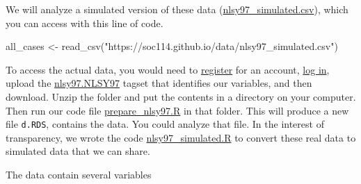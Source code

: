 \documentclass[
  letterpaper,
  DIV=11,
  numbers=noendperiod]{scrartcl}
\newenvironment{Shaded}{\begin{snugshade}}{\end{snugshade}}
\newcommand{\FunctionTok}[1]{\textcolor[rgb]{0.28,0.35,0.67}{#1}}
\newcommand{\NormalTok}[1]{\textcolor[rgb]{0.00,0.23,0.31}{#1}}
\newcommand{\OtherTok}[1]{\textcolor[rgb]{0.00,0.23,0.31}{#1}}
\newcommand{\StringTok}[1]{\textcolor[rgb]{0.13,0.47,0.30}{#1}}
\begin{document}
We will analyze a simulated version of these data
(\href{../data/nlsy97_simulated.csv}{nlsy97\_simulated.csv}), which you
can access with this line of code.

\begin{Shaded}
\begin{Highlighting}[]
\NormalTok{all\_cases }\OtherTok{\textless{}{-}} \FunctionTok{read\_csv}\NormalTok{(}\StringTok{"https://soc114.github.io/data/nlsy97\_simulated.csv"}\NormalTok{)}
\end{Highlighting}
\end{Shaded}

\begin{tcolorbox}[enhanced jigsaw, leftrule=.75mm, breakable, opacityback=0, opacitybacktitle=0.6, colframe=quarto-callout-note-color-frame, toprule=.15mm, bottomrule=.15mm, rightrule=.15mm, colbacktitle=quarto-callout-note-color!10!white, arc=.35mm, colback=white, titlerule=0mm, left=2mm, toptitle=1mm, bottomtitle=1mm, title=\textcolor{quarto-callout-note-color}{\faInfo}\hspace{0.5em}{Expand to learn how to get the actual data}, coltitle=black]

To access the actual data, you would need to
\href{https://nlsinfo.org/investigator/pages/register}{register} for an
account, \href{https://nlsinfo.org/investigator/pages/login}{log in},
upload the \href{../code/nlsy97.NLSY97}{nlsy97.NLSY97} tagset that
identifies our variables, and then download. Unzip the folder and put
the contents in a directory on your computer. Then run our code file
\href{../code/prepare_nlsy97.R}{prepare\_nlsy97.R} in that folder. This
will produce a new file \texttt{d.RDS}, contains the data. You could
analyze that file. In the interest of transparency, we wrote the code
\href{../data/nlsy97_simulated.R}{nlsy97\_simulated.R} to convert these
real data to simulated data that we can share.

\end{tcolorbox}

The data contain several variables
\end{document}
